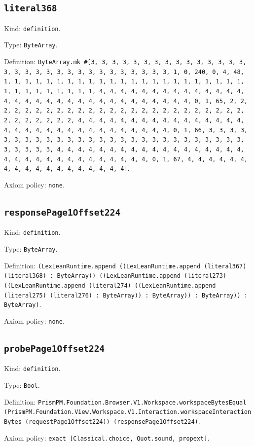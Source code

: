 \documentclass[11pt]{article}
\begin{document}
\subsection*{\texttt{literal368}}
\noindent Kind: \texttt{definition}.\par
\noindent Type: \texttt{ByteArray}.\par
\noindent Definition: \texttt{ByteArray.mk \#[3, 3, 3, 3, 3, 3, 3, 3, 3, 3, 3, 3, 3, 3, 3, 3, 3, 3, 3, 3, 3, 3, 3, 3, 3, 3, 3, 3, 3, 3, 3, 1, 0, 240, 0, 4, 48, 1, 1, 1, 1, 1, 1, 1, 1, 1, 1, 1, 1, 1, 1, 1, 1, 1, 1, 1, 1, 1, 1, 1, 1, 1, 1, 1, 1, 1, 1, 1, 1, 4, 4, 4, 4, 4, 4, 4, 4, 4, 4, 4, 4, 4, 4, 4, 4, 4, 4, 4, 4, 4, 4, 4, 4, 4, 4, 4, 4, 4, 4, 4, 4, 0, 1, 65, 2, 2, 2, 2, 2, 2, 2, 2, 2, 2, 2, 2, 2, 2, 2, 2, 2, 2, 2, 2, 2, 2, 2, 2, 2, 2, 2, 2, 2, 2, 2, 2, 4, 4, 4, 4, 4, 4, 4, 4, 4, 4, 4, 4, 4, 4, 4, 4, 4, 4, 4, 4, 4, 4, 4, 4, 4, 4, 4, 4, 4, 4, 4, 4, 0, 1, 66, 3, 3, 3, 3, 3, 3, 3, 3, 3, 3, 3, 3, 3, 3, 3, 3, 3, 3, 3, 3, 3, 3, 3, 3, 3, 3, 3, 3, 3, 3, 3, 3, 4, 4, 4, 4, 4, 4, 4, 4, 4, 4, 4, 4, 4, 4, 4, 4, 4, 4, 4, 4, 4, 4, 4, 4, 4, 4, 4, 4, 4, 4, 4, 4, 0, 1, 67, 4, 4, 4, 4, 4, 4, 4, 4, 4, 4, 4, 4, 4, 4, 4, 4, 4, 4]}.\par
\noindent Axiom policy: \texttt{none}.\par
\subsection*{\texttt{responsePage1Offset224}}
\noindent Kind: \texttt{definition}.\par
\noindent Type: \texttt{ByteArray}.\par
\noindent Definition: \texttt{(LexLeanRuntime.append ((LexLeanRuntime.append (literal367) (literal368) : ByteArray)) ((LexLeanRuntime.append (literal273) ((LexLeanRuntime.append (literal274) ((LexLeanRuntime.append (literal275) (literal276) : ByteArray)) : ByteArray)) : ByteArray)) : ByteArray)}.\par
\noindent Axiom policy: \texttt{none}.\par
\subsection*{\texttt{probePage1Offset224}}
\noindent Kind: \texttt{definition}.\par
\noindent Type: \texttt{Bool}.\par
\noindent Definition: \texttt{PrismPM.Foundation.Browser.V1.Workspace.workspaceBytesEqual (PrismPM.Foundation.View.Workspace.V1.Interaction.workspaceInteractionBytes (requestPage1Offset224)) (responsePage1Offset224)}.\par
\noindent Axiom policy: \texttt{exact [Classical.choice, Quot.sound, propext]}.\par
\end{document}
